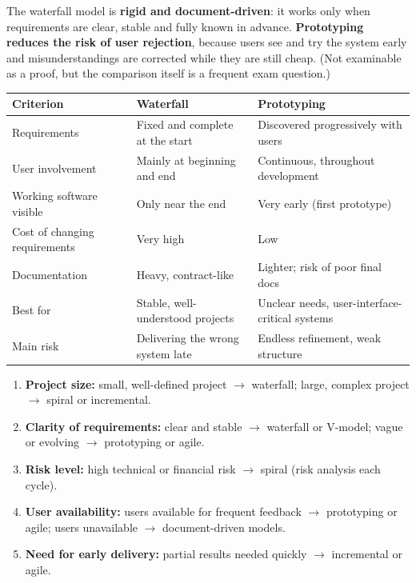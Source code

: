 \documentclass[11pt]{article}
\begin{document}
\begin{propriete}
The waterfall model is \textbf{rigid and document-driven}: it works only when requirements are clear, stable and fully known in advance. \textbf{Prototyping reduces the risk of user rejection}, because users see and try the system early and misunderstandings are corrected while they are still cheap. (Not examinable as a proof, but the comparison itself is a frequent exam question.)
\end{propriete}

\begin{center}
\begin{tabularx}{\linewidth}{|l|X|X|}
\hline
\rowcolor{popblueL} \textbf{Criterion} & \textbf{Waterfall} & \textbf{Prototyping} \\
\hline
Requirements & Fixed and complete at the start & Discovered progressively with users \\
\hline
User involvement & Mainly at beginning and end & Continuous, throughout development \\
\hline
Working software visible & Only near the end & Very early (first prototype) \\
\hline
Cost of changing requirements & Very high & Low \\
\hline
Documentation & Heavy, contract-like & Lighter; risk of poor final docs \\
\hline
Best for & Stable, well-understood projects & Unclear needs, user-interface-critical systems \\
\hline
Main risk & Delivering the wrong system late & Endless refinement, weak structure \\
\hline
\end{tabularx}
\end{center}

\begin{methode}
\begin{enumerate}
\item \textbf{Project size:} small, well-defined project $\rightarrow$ waterfall; large, complex project $\rightarrow$ spiral or incremental.
\item \textbf{Clarity of requirements:} clear and stable $\rightarrow$ waterfall or V-model; vague or evolving $\rightarrow$ prototyping or agile.
\item \textbf{Risk level:} high technical or financial risk $\rightarrow$ spiral (risk analysis each cycle).
\item \textbf{User availability:} users available for frequent feedback $\rightarrow$ prototyping or agile; users unavailable $\rightarrow$ document-driven models.
\item \textbf{Need for early delivery:} partial results needed quickly $\rightarrow$ incremental or agile.
\end{enumerate}
\end{methode}
\end{document}
